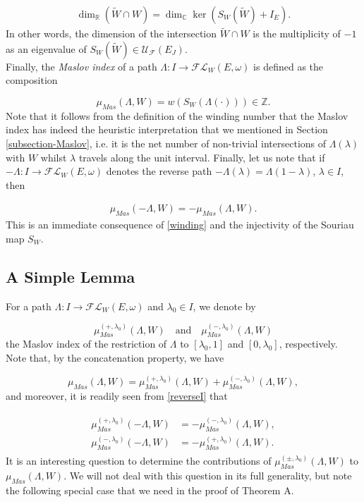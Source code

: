 \documentclass[a4paper,10pt]{article}
\begin{document}
\begin{align}\label{dimensionequalitySauriou}
\dim_{\mathbb{R}}(\tilde{W}\cap W)=\dim_{\mathbb{C}}\ker(S_W(\tilde{W})+I_E).
\end{align}
In other words, the dimension of the intersection $\tilde{W}\cap W$ is the multiplicity of $-1$ as an eigenvalue of $S_W(\tilde{W})\in\mathcal{U}_{\mathcal{F}}(E_J)$.\\
Finally, the \textit{Maslov index} of a path $\Lambda:I\rightarrow\mathcal{FL}_W(E,\omega)$ is defined as the composition

\[\mu_{Mas}(\Lambda,W)=w(S_W(\Lambda(\cdot)))\in\mathbb{Z}.\] 
Note that it follows from the definition of the winding number that the Maslov index has indeed the heuristic interpretation that we mentioned in Section \ref{subsection-Maslov}, i.e. it is the net number of non-trivial intersections of $\Lambda(\lambda)$ with $W$ whilst $\lambda$ travels along the unit interval. Finally, let us note that if $-\Lambda:I\rightarrow\mathcal{FL}_W(E,\omega)$ denotes the reverse path $-\Lambda(\lambda)=\Lambda(1-\lambda)$, $\lambda\in I$, then

\begin{align}\label{reverseI}
\mu_{Mas}(-\Lambda,W)=-\mu_{Mas}(\Lambda,W).
\end{align}
This is an immediate consequence of \eqref{winding} and the injectivity of the Souriau map $S_W$.  



\subsection{A Simple Lemma}\label{section-Maslovmidpoint}
For a path $\Lambda:I\rightarrow\mathcal{FL}_W(E,\omega)$ and $\lambda_0\in I$, we denote by 

\[\mu_{Mas}^{(+,\lambda_0)}(\Lambda,W)\quad\text{and}\quad \mu_{Mas}^{(-,\lambda_0)}(\Lambda,W)\] 
the Maslov index of the restriction of $\Lambda$ to $[\lambda_0,1]$ and $[0,\lambda_0]$, respectively. Note that, by the concatenation property, we have

\[\mu_{Mas}(\Lambda,W)=\mu_{Mas}^{(+,\lambda_0)}(\Lambda,W)+\mu_{Mas}^{(-,\lambda_0)}(\Lambda,W),\]
and moreover, it is readily seen from \eqref{reverseI} that

\begin{align}\label{reverseII}
\begin{split}
\mu_{Mas}^{(+,\lambda_0)}(-\Lambda,W)&=-\mu_{Mas}^{(-,\lambda_0)}(\Lambda,W),\\
\mu_{Mas}^{(-,\lambda_0)}(-\Lambda,W)&=-\mu_{Mas}^{(+,\lambda_0)}(\Lambda,W).
\end{split}
\end{align}
It is an interesting question to determine the contributions of $\mu_{Mas}^{(\pm,\lambda_0)}(\Lambda,W)$ to $\mu_{Mas}(\Lambda,W)$. We will not deal with this question in its full generality, but note the following special case that we need in the proof of Theorem A.
\end{document}
